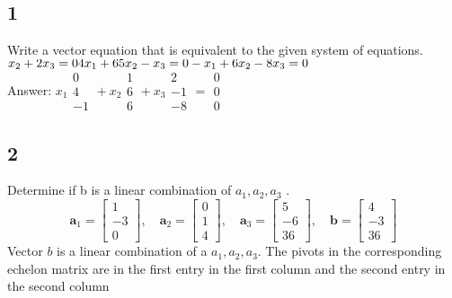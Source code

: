 \documentclass{article}
\begin{document}
\subsection*{1}
Write a vector equation that is equivalent to the given system of equations.
$\\x_2+2x_3=0 \\ 4x_1+65x_2-x_3=0 \\ -x_1+6x_2-8x_3=0$
\\Answer: 
$x_1 \begin{array}{c}0\\4\\-1\end{array} + x_2 \begin{array}{c}1\\6\\6\end{array} + x_3 \begin{array}{c}2\\-1\\-8\end{array}= \begin{array}{c}0\\0\\0\end{array}$
\subsection*{2}
Determine if b is a linear combination of $a_1, a_2, a_3$ .
\[\mathbf{a}_1 =\begin{bmatrix}1 \\-3 \\0\end{bmatrix},\quad\mathbf{a}_2 =\begin{bmatrix}0 \\1 \\4\end{bmatrix},\quad\mathbf{a}_3 =\begin{bmatrix}5 \\-6 \\36\end{bmatrix},\quad\mathbf{b} =\begin{bmatrix}4 \\-3 \\36\end{bmatrix}\]
Vector $b$ is a linear combination of a $a_1,a_2,a_3$. The pivots in the corresponding echelon matrix are in the first entry in the first column and the second entry in the second column
\end{document}
